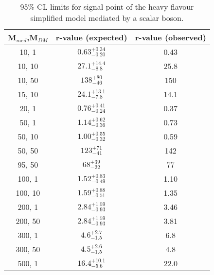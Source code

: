 \begin{table}[h!]
    \caption{%
    95\% CL limits for signal point of the heavy flavour simplified model 
    mediated by a scalar boson. }
    \label{tab:DMttS_limits}
    \centering
    \begin{tabular}{ ccc }
        \hline\hline
        M$_{med}$,M$_{DM}$ & r-value (expected) & r-value (observed) \\ 
        \hline
        10, 1   & $0.63_{-0.20}^{+0.34}$ & 0.43 \\
        10, 10  & $27.1_{-8.8}^{+14.4}$  & 25.8 \\
        10, 50  & $138_{-46}^{+80}$      & 150  \\
        15, 10  & $24.1_{-7.8}^{+13.1}$  & 14.1 \\
        20, 1   & $0.76_{-0.24}^{+0.41}$ & 0.37 \\
        50, 1   & $1.14_{-0.36}^{+0.62}$ & 0.73 \\
        50, 10  & $1.00_{-0.32}^{+0.55}$ & 0.59 \\
        50, 50  & $123_{-41}^{+71}$      & 142  \\
        95, 50  & $68_{-22}^{+39}$       & 77   \\
        100, 1  & $1.52_{-0.49}^{+0.83}$ & 1.10 \\
        100, 10 & $1.59_{-0.51}^{+0.88}$ & 1.35 \\
        200, 1  & $2.84_{-0.93}^{+1.59}$ & 3.46 \\
        200, 50 & $2.84_{-0.93}^{+1.59}$ & 3.81 \\
        300, 1  & $4.6_{-1.5}^{+2.7}$    & 6.8  \\
        300, 50 & $4.5_{-1.5}^{+2.6}$    & 4.8  \\
        500, 1  & $16.4_{-5.6}^{+10.1}$  & 22.0 \\
        \hline\hline
    \end{tabular}
\end{table}


